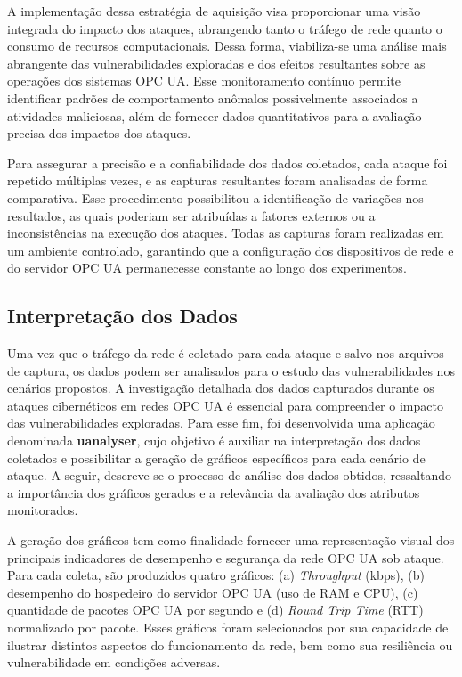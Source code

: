         A implementação dessa estratégia de aquisição visa proporcionar uma visão integrada do impacto dos ataques, abrangendo tanto o tráfego de rede quanto o consumo de recursos computacionais. Dessa forma, viabiliza-se uma análise mais abrangente das vulnerabilidades exploradas e dos efeitos resultantes sobre as operações dos sistemas OPC UA. Esse monitoramento contínuo permite identificar padrões de comportamento anômalos possivelmente associados a atividades maliciosas, além de fornecer dados quantitativos para a avaliação precisa dos impactos dos ataques.

        Para assegurar a precisão e a confiabilidade dos dados coletados, cada ataque foi repetido múltiplas vezes, e as capturas resultantes foram analisadas de forma comparativa. Esse procedimento possibilitou a identificação de variações nos resultados, as quais poderiam ser atribuídas a fatores externos ou a inconsistências na execução dos ataques. Todas as capturas foram realizadas em um ambiente controlado, garantindo que a configuração dos dispositivos de rede e do servidor OPC UA permanecesse constante ao longo dos experimentos.

    \subsection{Interpretação dos Dados}

        Uma vez que o tráfego da rede é coletado para cada ataque e salvo nos arquivos de captura, os dados podem ser analisados para o estudo das vulnerabilidades nos cenários propostos. A investigação detalhada dos dados capturados durante os ataques cibernéticos em redes OPC UA é essencial para compreender o impacto das vulnerabilidades exploradas. Para esse fim, foi desenvolvida uma aplicação denominada \textbf{uanalyser}, cujo objetivo é auxiliar na interpretação dos dados coletados e possibilitar a geração de gráficos específicos para cada cenário de ataque. A seguir, descreve-se o processo de análise dos dados obtidos, ressaltando a importância dos gráficos gerados e a relevância da avaliação dos atributos monitorados.

        A geração dos gráficos tem como finalidade fornecer uma representação visual dos principais indicadores de desempenho e segurança da rede OPC UA sob ataque. Para cada coleta, são produzidos quatro gráficos: (a) \textit{Throughput} (kbps), (b) desempenho do hospedeiro do servidor OPC UA (uso de RAM e CPU), (c) quantidade de pacotes OPC UA por segundo e (d) \textit{Round Trip Time} (RTT) normalizado por pacote. Esses gráficos foram selecionados por sua capacidade de ilustrar distintos aspectos do funcionamento da rede, bem como sua resiliência ou vulnerabilidade em condições adversas.
        
